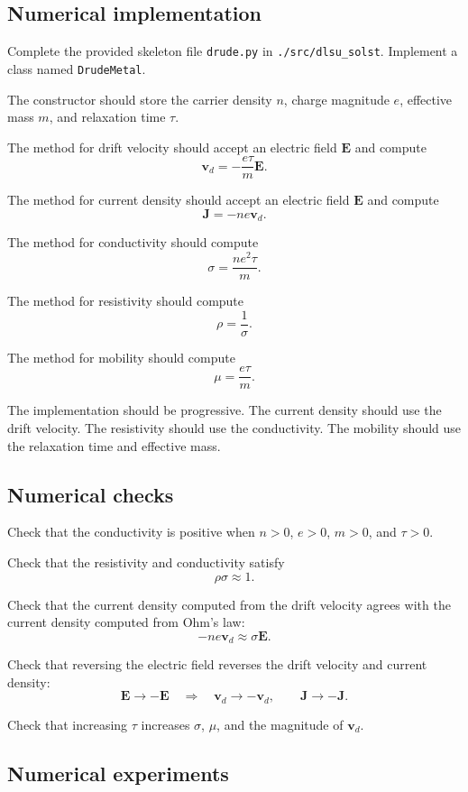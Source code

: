 \subsection{Numerical implementation}

Complete the provided skeleton file \texttt{drude.py} in \texttt{./src/dlsu\_solst}. Implement a class named \texttt{DrudeMetal}.

The constructor should store the carrier density \(n\), charge magnitude \(e\), effective mass \(m\), and relaxation time \(\tau\).

The method for drift velocity should accept an electric field \(\mathbf E\) and compute
\[
\mathbf v_d=-\frac{e\tau}{m}\mathbf E.
\]

The method for current density should accept an electric field \(\mathbf E\) and compute
\[
\mathbf J=-ne\mathbf v_d.
\]

The method for conductivity should compute
\[
\sigma=\frac{ne^2\tau}{m}.
\]

The method for resistivity should compute
\[
\rho=\frac{1}{\sigma}.
\]

The method for mobility should compute
\[
\mu=\frac{e\tau}{m}.
\]

The implementation should be progressive. The current density should use the drift velocity. The resistivity should use the conductivity. The mobility should use the relaxation time and effective mass.

\subsection{Numerical checks}

Check that the conductivity is positive when \(n>0\), \(e>0\), \(m>0\), and \(\tau>0\).

Check that the resistivity and conductivity satisfy
\[
\rho\sigma\approx1.
\]

Check that the current density computed from the drift velocity agrees with the current density computed from Ohm's law:
\[
-ne\mathbf v_d\approx\sigma\mathbf E.
\]

Check that reversing the electric field reverses the drift velocity and current density:
\[
\mathbf E\rightarrow-\mathbf E
\quad\Longrightarrow\quad
\mathbf v_d\rightarrow-\mathbf v_d,
\qquad
\mathbf J\rightarrow-\mathbf J.
\]

Check that increasing \(\tau\) increases \(\sigma\), \(\mu\), and the magnitude of \(\mathbf v_d\).

\subsection{Numerical experiments}

